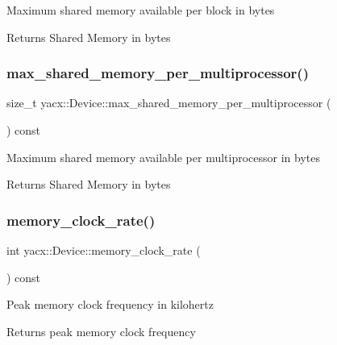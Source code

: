 Maximum shared memory available per block in bytes \begin{DoxyReturn}{Returns}
Shared Memory in bytes 
\end{DoxyReturn}
\mbox{\label{classyacx_1_1_device_ac1dcf4a775430a5334eb5c51586a69a2}} 
\subsubsection{\texorpdfstring{max\+\_\+shared\+\_\+memory\+\_\+per\+\_\+multiprocessor()}{max\_shared\_memory\_per\_multiprocessor()}}
{\footnotesize\ttfamily size\+\_\+t yacx\+::\+Device\+::max\+\_\+shared\+\_\+memory\+\_\+per\+\_\+multiprocessor (\begin{DoxyParamCaption}{ }\end{DoxyParamCaption}) const\hspace{0.3cm}{\ttfamily [inline]}}

Maximum shared memory available per multiprocessor in bytes \begin{DoxyReturn}{Returns}
Shared Memory in bytes 
\end{DoxyReturn}
\mbox{\label{classyacx_1_1_device_a41a46878ca07cfbbfd553aeae6076e63}} 
\subsubsection{\texorpdfstring{memory\+\_\+clock\+\_\+rate()}{memory\_clock\_rate()}}
{\footnotesize\ttfamily int yacx\+::\+Device\+::memory\+\_\+clock\+\_\+rate (\begin{DoxyParamCaption}{ }\end{DoxyParamCaption}) const\hspace{0.3cm}{\ttfamily [inline]}}

Peak memory clock frequency in kilohertz \begin{DoxyReturn}{Returns}
peak memory clock frequency 
\end{DoxyReturn}
\mbox{\label{classyacx_1_1_device_a5d7a0d5f9c543768323cfc8807d9aa27}} 
